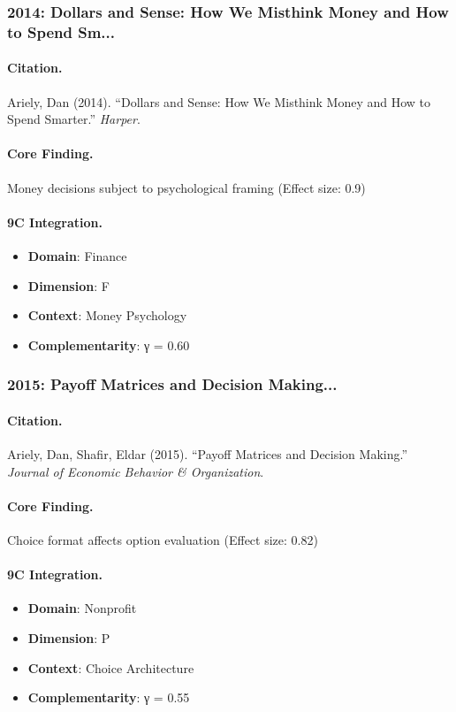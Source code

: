\subsubsection{2014: Dollars and Sense: How We Misthink Money and How to Spend Sm...}

\paragraph{Citation.}
Ariely, Dan (2014). ``Dollars and Sense: How We Misthink Money and How to Spend Smarter.''
\textit{Harper}.

\paragraph{Core Finding.}
Money decisions subject to psychological framing (Effect size: 0.9)

\paragraph{9C Integration.}
\begin{itemize}[nosep]
  \item \textbf{Domain}: Finance
  \item \textbf{Dimension}: F
  \item \textbf{Context}: Money Psychology
  \item \textbf{Complementarity}: γ = 0.60
\end{itemize}

\subsubsection{2015: Payoff Matrices and Decision Making...}

\paragraph{Citation.}
Ariely, Dan, Shafir, Eldar (2015). ``Payoff Matrices and Decision Making.''
\textit{Journal of Economic Behavior & Organization}.

\paragraph{Core Finding.}
Choice format affects option evaluation (Effect size: 0.82)

\paragraph{9C Integration.}
\begin{itemize}[nosep]
  \item \textbf{Domain}: Nonprofit
  \item \textbf{Dimension}: P
  \item \textbf{Context}: Choice Architecture
  \item \textbf{Complementarity}: γ = 0.55
\end{itemize}

